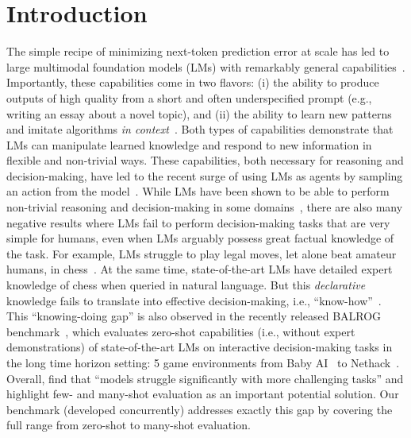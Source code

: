 \documentclass{article}
\newcommand{\eg}{e.g., }
\newcommand{\ie}{i.e., }
\begin{document}
    \section{Introduction}
\label{sec:introduction}
The simple recipe of minimizing next-token prediction error at scale has led to large multimodal foundation models (LMs) with remarkably general capabilities~\citep{openai2023gpt4, anil2023gemini, anthropic2024claude3}.
Importantly, these capabilities come in two flavors: (i) the ability to produce outputs of high quality from a short and often underspecified prompt (\eg writing an essay about a novel topic), and (ii) the ability to learn new patterns and imitate algorithms \emph{in context}~\citep{reid2024gemini, mirchandani2023large}.
Both types of capabilities demonstrate that LMs
can manipulate learned knowledge and respond to new information in flexible and non-trivial ways.
These capabilities, both necessary for reasoning and decision-making, have led to the recent surge of using LMs as agents by sampling an action from the model~\citep{mirchandani2023large, dipalo2024keypoint}.
While LMs have been shown to be able to perform non-trivial reasoning and decision-making in some domains~\citep{ huang2022language,yao2023react,romera2024mathematical}, there are also many negative results where LMs fail to perform decision-making tasks that are very simple for humans, even when LMs arguably possess great factual knowledge of the task.
For example, LMs struggle to play legal moves, let alone beat amateur humans, in chess~\citep{carlini2023playing}.
At the same time, state-of-the-art LMs have detailed expert knowledge of chess when queried in natural language. But this \emph{declarative} knowledge fails to translate into effective decision-making, \ie ``know-how''~\citep{ryle1949concept}.
This ``knowing-doing gap'' is also observed in the recently released BALROG benchmark~\citep{paglieri2025balrog}, which evaluates zero-shot capabilities (\ie without expert demonstrations) of state-of-the-art LMs on interactive decision-making tasks in the long time horizon setting: 5 game environments from Baby AI~\citep{chevalier2019babyai} to Nethack~\citep{kuttler2020nethack}.
Overall, \citet{paglieri2025balrog} find that ``models struggle significantly with more challenging tasks'' and highlight few- and many-shot evaluation as an important potential solution.
Our benchmark (developed concurrently) addresses exactly this gap by covering the full range from zero-shot to many-shot evaluation.
\end{document}
